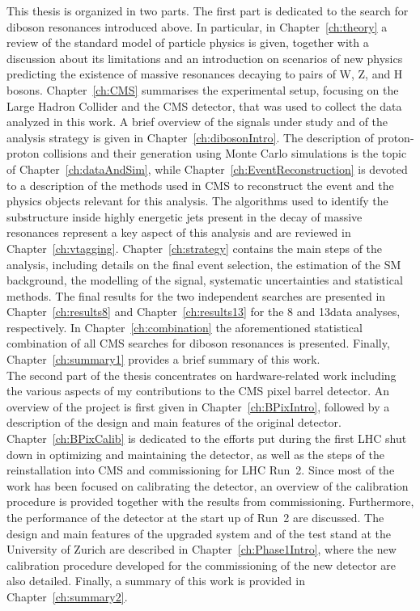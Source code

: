 This thesis is organized in two parts. The first part is dedicated to the search for diboson resonances introduced above. 
In particular, in Chapter~\ref{ch:theory} a review of the standard model of particle physics is given, together with a discussion about its limitations and an introduction on scenarios of new physics predicting the existence of massive resonances decaying to pairs of W, Z, and H bosons.
Chapter~\ref{ch:CMS} summarises the experimental setup, focusing on the Large Hadron Collider and the CMS detector, that was used to collect the data analyzed in this work.
A brief overview of the signals under study and of the analysis strategy is given in Chapter~\ref{ch:dibosonIntro}.
The description of proton-proton collisions and their generation using Monte Carlo simulations is the topic of Chapter~\ref{ch:dataAndSim}, while Chapter~\ref{ch:EventReconstruction} is devoted to a description of the methods used in CMS to reconstruct the event and the physics objects relevant for this analysis. The algorithms used to identify the substructure inside highly energetic jets present in the decay of massive resonances represent a key aspect of this analysis and are reviewed in Chapter~\ref{ch:vtagging}. Chapter~\ref{ch:strategy} contains the main steps of the analysis, including details on the final event selection, the estimation of the SM background, the modelling of the signal, systematic uncertainties and statistical methods. The final results for the two independent searches are presented in Chapter~\ref{ch:results8} and Chapter~\ref{ch:results13} for the 8 and 13\TeV data analyses, respectively.
In Chapter~\ref{ch:combination} the aforementioned statistical combination of all CMS searches for diboson resonances is presented. Finally, Chapter~\ref{ch:summary1} provides a brief summary of this work.\\

The second part of the thesis concentrates on hardware-related work including the various aspects of my contributions to the CMS pixel barrel detector.
An overview of the project is first given in Chapter~\ref{ch:BPixIntro}, followed by a description of the design and main features of the original detector.
Chapter~\ref{ch:BPixCalib} is dedicated to the efforts put during the first LHC shut down in optimizing and maintaining the detector, as well as the steps of the reinstallation into CMS and commissioning for LHC Run~2. Since most of the work has been focused on calibrating the detector, an overview of the calibration procedure is provided together with the results from commissioning. Furthermore, the performance of the detector at the start up of Run~2 are discussed.
The design and main features of the upgraded system and of the test stand at the University of Zurich are described in Chapter~\ref{ch:Phase1Intro}, where the new calibration procedure developed for the commissioning of the new detector are also detailed. Finally, a summary of this work is provided in Chapter~\ref{ch:summary2}.

